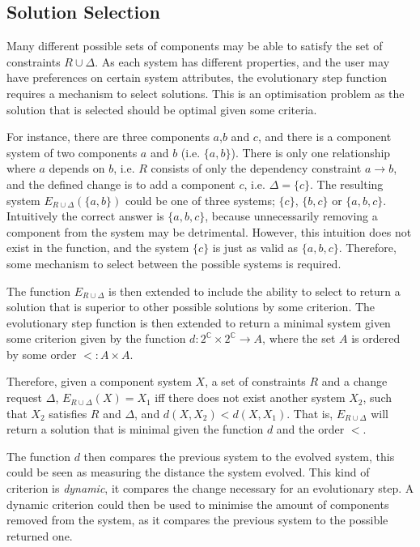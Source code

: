 \subsection{Solution Selection}
\label{formal.solsel}
Many different possible sets of components may be able to satisfy the set of constraints $R \cup \Delta$.
As each system has different properties, and the user may have preferences on certain system attributes,
the evolutionary step function requires a mechanism to select solutions.
This is an optimisation problem as the solution that is selected should be optimal given some criteria.

For instance, there are three components $a$,$b$ and $c$, and there is a component system of two components $a$ and $b$ (i.e. $\{a,b\}$).
There is only one relationship where $a$ depends on $b$, i.e. $R$ consists of only the dependency constraint $a \rightarrow b$,
and the defined change is to add a component $c$, i.e. $\Delta = \{c\}$.
The resulting system $E_{R \cup \Delta}(\{a,b\})$ could be one of three systems; $\{c\}$, $\{b,c\}$ or $\{a,b,c\}$.
Intuitively the correct answer is $\{a,b,c\}$, because unnecessarily removing a component from the system may be detrimental.
However, this intuition does not exist in the function, and the system $\{c\}$ is just as valid as $\{a,b,c\}$. 
Therefore, some mechanism to select between the possible systems is required.
  
The function $E_{R \cup \Delta}$ is then extended to include the ability to select to return a solution that is superior to other possible solutions by some criterion.
The evolutionary step function is then extended to return a minimal system given some criterion given by the function $d: 2^\mathbb{C} \times 2^\mathbb{C} \rightarrow A$,
where the set $A$ is ordered by some order $<: A \times A$.

Therefore, given a component system $X$, a set of constraints $R$ and a change request $\Delta$,
$E_{R \cup \Delta}(X) = X_1$ iff there does not exist another system $X_2$, such that $X_2$ satisfies $R$ and $\Delta$, 
and $d(X,X_2) < d(X,X_1)$.
That is, $E_{R \cup \Delta}$ will return a solution that is minimal given the function $d$ and the order $<$.

The function $d$ then compares the previous system to the evolved system, this could be seen as measuring the distance the system evolved.
This kind of criterion is \textit{dynamic}, it compares the change necessary for an evolutionary step.
A dynamic criterion could then be used to minimise the amount of components removed from the system, as it compares the previous system to the possible returned one.

